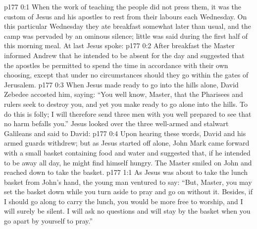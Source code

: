 \author{Midwayer Commission}
\vs p177 0:1 When the work of teaching the people did not press them, it was the custom of Jesus and his apostles to rest from their labours each Wednesday. On this particular Wednesday they ate breakfast somewhat later than usual, and the camp was pervaded by an ominous silence; little was said during the first half of this morning meal. At last Jesus spoke: 
\vs p177 0:2 After breakfast the Master informed Andrew that he intended to be absent for the day and suggested that the apostles be permitted to spend the time in accordance with their own choosing, except that under no circumstances should they go within the gates of Jerusalem.
\vs p177 0:3 When Jesus made ready to go into the hills alone, David Zebedee accosted him, saying: “You well know, Master, that the Pharisees and rulers seek to destroy you, and yet you make ready to go alone into the hills. To do this is folly; I will therefore send three men with you well prepared to see that no harm befalls you.” Jesus looked over the three well\hyp{}armed and stalwart Galileans and said to David: 
\vs p177 0:4 Upon hearing these words, David and his armed guards withdrew; but as Jesus started off alone, John Mark came forward with a small basket containing food and water and suggested that, if he intended to be away all day, he might find himself hungry. The Master smiled on John and reached down to take the basket.
\vs p177 1:1 As Jesus was about to take the lunch basket from John’s hand, the young man ventured to say: “But, Master, you may set the basket down while you turn aside to pray and go on without it. Besides, if I should go along to carry the lunch, you would be more free to worship, and I will surely be silent. I will ask no questions and will stay by the basket when you go apart by yourself to pray.”
